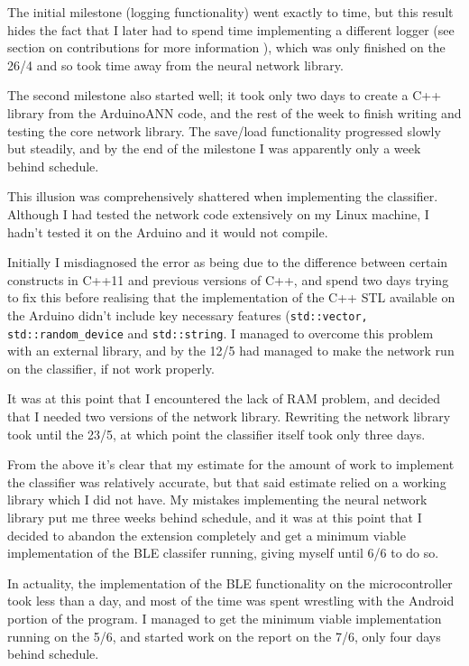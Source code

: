 \documentclass[a4paper]{article}
\begin{document}
The initial milestone (logging functionality) went exactly to time, but this result hides the fact that I later had to spend time implementing a different logger (see section on contributions for more information ), which was only finished on the 26/4 and so took time away from the neural network library.

The second milestone also started well; it took only two days to create a C++ library from the ArduinoANN code, and the rest of the week to finish writing and testing the core network library. The save/load functionality progressed slowly but steadily, and by the end of the milestone I was apparently only a week behind schedule.

This illusion was comprehensively shattered when implementing the classifier. Although I had tested the network code extensively on my Linux machine, I hadn't tested it on the Arduino and it would not compile.

Initially I misdiagnosed the error as being due to the difference between certain constructs in C++11 and previous versions of C++, and spend two days trying to fix this before realising that the implementation of the C++ STL available on the Arduino didn't include key necessary features (\lstinline{std::vector, std::random_device} and \lstinline{std::string}. I managed to overcome this problem with an external library, and by the 12/5 had managed to make the network run on the classifier, if not work properly.

It was at this point that I encountered the lack of RAM problem, and decided that I needed two versions of the network library. Rewriting the network library took until the 23/5, at which point the classifier itself took only three days. 

From the above it's clear that my estimate for the amount of work to implement the classifier was relatively accurate, but that said estimate relied on a working library which I did not have. My mistakes implementing the neural network library put me three weeks behind schedule, and it was at this point that I decided to abandon the extension completely and get a minimum viable implementation of the BLE classifer running, giving myself until 6/6 to do so.

In actuality, the implementation of the BLE functionality on the microcontroller took less than a day, and most of the time was spent wrestling with the Android portion of the program. I managed to get the minimum viable implementation running on the 5/6, and started work on the report on the 7/6, only four days behind schedule.
\end{document}

